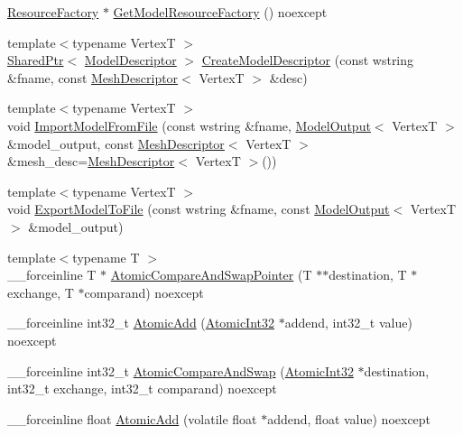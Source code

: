 \begin{DoxyCompactItemize}
\item 
\hyperlink{classmage_1_1_resource_factory}{Resource\+Factory} $\ast$ \hyperlink{namespacemage_a9e1af7d81b6fc43a327bbe5df092dc0c}{Get\+Model\+Resource\+Factory} () noexcept
\item 
{\footnotesize template$<$typename VertexT $>$ }\\\hyperlink{namespacemage_a1e01ae66713838a7a67d30e44c67703e}{Shared\+Ptr}$<$ \hyperlink{classmage_1_1_model_descriptor}{Model\+Descriptor} $>$ \hyperlink{namespacemage_a8cc26f80d3cb6f3d457bb06942880d84}{Create\+Model\+Descriptor} (const wstring \&fname, const \hyperlink{structmage_1_1_mesh_descriptor}{Mesh\+Descriptor}$<$ VertexT $>$ \&desc)
\item 
{\footnotesize template$<$typename VertexT $>$ }\\void \hyperlink{namespacemage_a3b43f166d61c14d680b28614da17ac2b}{Import\+Model\+From\+File} (const wstring \&fname, \hyperlink{structmage_1_1_model_output}{Model\+Output}$<$ VertexT $>$ \&model\+\_\+output, const \hyperlink{structmage_1_1_mesh_descriptor}{Mesh\+Descriptor}$<$ VertexT $>$ \&mesh\+\_\+desc=\hyperlink{structmage_1_1_mesh_descriptor}{Mesh\+Descriptor}$<$ VertexT $>$())
\item 
{\footnotesize template$<$typename VertexT $>$ }\\void \hyperlink{namespacemage_a3cb120c707ba8db950082a33d76b3ec8}{Export\+Model\+To\+File} (const wstring \&fname, const \hyperlink{structmage_1_1_model_output}{Model\+Output}$<$ VertexT $>$ \&model\+\_\+output)
\item 
{\footnotesize template$<$typename T $>$ }\\\+\_\+\+\_\+forceinline T $\ast$ \hyperlink{namespacemage_a5593c1224a3a35c464a89233b3eb7d81}{Atomic\+Compare\+And\+Swap\+Pointer} (T $\ast$$\ast$destination, T $\ast$exchange, T $\ast$comparand) noexcept
\item 
\+\_\+\+\_\+forceinline int32\+\_\+t \hyperlink{namespacemage_a2b21459e56814e37cc43a2f8ff56337a}{Atomic\+Add} (\hyperlink{namespacemage_a37ac3b8da2d89495d105e00f1022cb1e}{Atomic\+Int32} $\ast$addend, int32\+\_\+t value) noexcept
\item 
\+\_\+\+\_\+forceinline int32\+\_\+t \hyperlink{namespacemage_a787cb57d9fe1b75a485f2d0ab0552396}{Atomic\+Compare\+And\+Swap} (\hyperlink{namespacemage_a37ac3b8da2d89495d105e00f1022cb1e}{Atomic\+Int32} $\ast$destination, int32\+\_\+t exchange, int32\+\_\+t comparand) noexcept
\item 
\+\_\+\+\_\+forceinline float \hyperlink{namespacemage_a94c5a276c88460f639235ec6632ba316}{Atomic\+Add} (volatile float $\ast$addend, float value) noexcept
$$
\end{DoxyCompactItemize}
